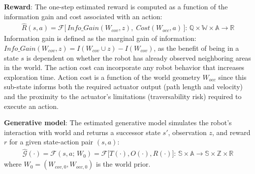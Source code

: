 \documentclass{article}
\newcommand{\ph}[1]{{\textbf{#1}:}} %
\begin{document}

\ph{Reward} The one-step estimated reward is computed as a function of the information gain and cost associated with an action:
\begin{align}
    \hat{R}(s, a) = \mathcal{F}\Big[\, \textit{Info\_Gain}(W_{cov}, z), \; \textit{Cost}(W_{occ}, a) \, \Big]: \, \mathbb{Q} \times \mathbb{W} \times \mathbb{A} \rightarrow \mathbb{R} 
\end{align}
Information gain is defined as the marginal gain of information: $\textit{Info\_Gain}(W_{cov}, z) = I(W_{cov} \cup z) - I(W_{cov})$, as the benefit of being in a state $s$ is dependent on whether the robot has already observed neighboring areas in the world. The action cost can incorporate any robot behavior that increases exploration time. Action cost is a function of the world geometry $W_{occ}$ since this sub-state informs both the required actuator output (path length and velocity) and the proximity to the actuator's limitations (traversability risk) required to execute an action.



\ph{Generative model} The estimated generative model simulates the robot's interaction with world and returns a successor state $s'$, observation $z$, and reward $r$ for a given state-action pair $(s,a)$:
\begin{align}
    \hat{\mathcal{G}}(\cdot) = \mathcal{F}(s, a; \, W_0) = \mathcal{F}\big[T(\cdot), O(\cdot), R(\cdot)\big]: \, \mathbb{S} \times \mathbb{A} \rightarrow \mathbb{S} \times \mathbb{Z} \times \mathbb{R} 
\end{align}
where $W_0 = (W_{cov,0}, W_{occ,0})$ is the world prior. 
\end{document}
